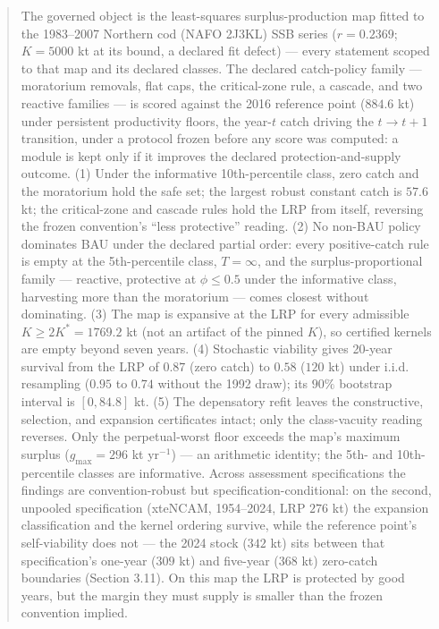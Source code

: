 \documentclass[11pt]{article}
\begin{document}
\begin{abstract}


The governed object is the least-squares surplus-production map fitted
to the 1983--2007 Northern cod (NAFO 2J3KL) SSB series (\(r = 0.2369\);
\(K = 5000\) kt at its bound, a declared fit defect) --- every statement
scoped to that map and its declared classes. The declared catch-policy
family --- moratorium removals, flat caps, the critical-zone rule, a
cascade, and two reactive families --- is scored against the 2016
reference point (\(884.6\) kt) under persistent productivity floors, the
year-\(t\) catch driving the \(t \to t+1\) transition, under a protocol
frozen before any score was computed: a module is kept only if it
improves the declared protection-and-supply outcome. (1) Under the
informative 10th-percentile class, zero catch and the moratorium hold
the safe set; the largest robust constant catch is \(57.6\) kt; the
critical-zone and cascade rules hold the LRP from itself, reversing the
frozen convention's ``less protective'' reading. (2) No non-BAU policy
dominates BAU under the declared partial order: every positive-catch
rule is empty at the 5th-percentile class, \(T=\infty\), and the
surplus-proportional family --- reactive, protective at \(\phi \le 0.5\)
under the informative class, harvesting more than the moratorium ---
comes closest without dominating. (3) The map is expansive at the LRP
for every admissible \(K \ge 2K^* = 1769.2\) kt (not an artifact of the
pinned \(K\)), so certified kernels are empty beyond seven years. (4)
Stochastic viability gives 20-year survival from the LRP of \(0.87\)
(zero catch) to \(0.58\) (\(120\) kt) under i.i.d. resampling
(\(0.95\) to \(0.74\) without the 1992 draw); its \(90\%\) bootstrap interval
is \([0, 84.8]\) kt. (5) The depensatory refit leaves the constructive,
selection, and expansion certificates intact; only the class-vacuity
reading reverses. Only the perpetual-worst floor exceeds the map's
maximum surplus (\(g_{\max} = 296\) kt yr\(^{-1}\)) --- an arithmetic
identity; the 5th- and 10th-percentile classes are informative.
Across assessment specifications the findings are convention-robust but
specification-conditional: on the second, unpooled specification
(xteNCAM, 1954--2024, LRP \(276\) kt) the expansion classification and
the kernel ordering survive, while the reference point's self-viability
does not --- the 2024 stock (\(342\) kt) sits between that
specification's one-year (\(309\) kt) and five-year (\(368\) kt)
zero-catch boundaries (Section 3.11). On this
map the LRP is protected by good years, but the margin they must supply
is smaller than the frozen convention implied.

\end{abstract}
\end{document}
